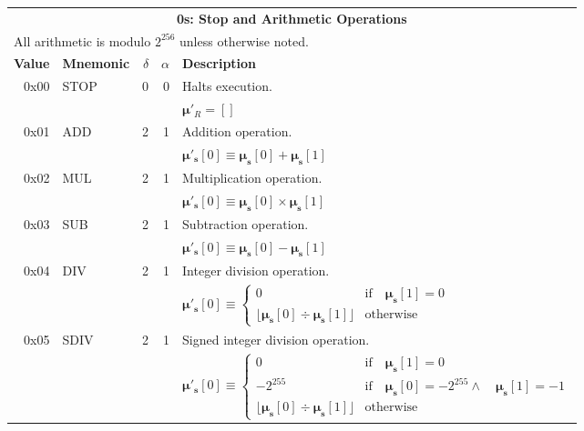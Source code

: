 \documentclass[9pt,oneside]{amsart}
\begin{document}
\begin{tabular*}{\columnwidth}[h]{rlrrl}
\toprule
\multicolumn{5}{c}{\textbf{0s: Stop and Arithmetic Operations}} \\
\multicolumn{5}{l}{All arithmetic is modulo $2^{256}$ unless otherwise noted.} \vspace{5pt} \\
\textbf{Value} & \textbf{Mnemonic} & $\delta$ & $\alpha$ & \textbf{Description} \vspace{5pt} \\
0x00 & {\small STOP} & 0 & 0 & Halts execution. \\
&&&& $\boldsymbol{\mu}'_R = []$ \\
\midrule
0x01 & {\small ADD} & 2 & 1 & Addition operation. \\
&&&& $\boldsymbol{\mu}'_\mathbf{s}[0] \equiv \boldsymbol{\mu}_\mathbf{s}[0] + \boldsymbol{\mu}_\mathbf{s}[1]$ \\
\midrule
0x02 & {\small MUL} & 2 & 1 & Multiplication operation. \\
&&&& $\boldsymbol{\mu}'_\mathbf{s}[0] \equiv \boldsymbol{\mu}_\mathbf{s}[0] \times \boldsymbol{\mu}_\mathbf{s}[1]$ \\
\midrule
0x03 & {\small SUB} & 2 & 1 & Subtraction operation. \\
&&&& $\boldsymbol{\mu}'_\mathbf{s}[0] \equiv \boldsymbol{\mu}_\mathbf{s}[0] - \boldsymbol{\mu}_\mathbf{s}[1]$ \\
\midrule
0x04 & {\small DIV} & 2 & 1 & Integer division operation. \\
&&&& $\boldsymbol{\mu}'_\mathbf{s}[0] \equiv \begin{cases}0 & \text{if} \quad \boldsymbol{\mu}_\mathbf{s}[1] = 0\\ \lfloor\boldsymbol{\mu}_\mathbf{s}[0] \div \boldsymbol{\mu}_\mathbf{s}[1]\rfloor & \text{otherwise}\end{cases}$  \\
\midrule
0x05 & {\small SDIV} & 2 & 1 & Signed integer division operation. \\
&&&& $\boldsymbol{\mu}'_\mathbf{s}[0] \equiv \begin{cases}0 & \text{if} \quad \boldsymbol{\mu}_\mathbf{s}[1] = 0\\ -2^{255} & \text{if} \quad \boldsymbol{\mu}_\mathbf{s}[0] = -2^{255} \wedge \quad \boldsymbol{\mu}_\mathbf{s}[1] = -1\\ \lfloor\boldsymbol{\mu}_\mathbf{s}[0] \div \boldsymbol{\mu}_\mathbf{s}[1]\rfloor & \text{otherwise}\end{cases}$  \\

\end{tabular*}
\end{document}
